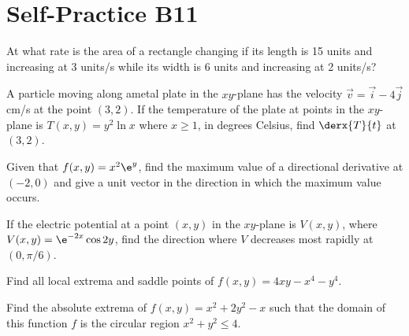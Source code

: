 \section{Self-Practice B11}

\begin{problem}
    At what rate is the area of a rectangle changing if its length is 15 units and increasing at 3 units/s while its width is 6 units and increasing at 2 units/s?
\end{problem}

\begin{problem}
    A particle moving along ametal plate in the $xy$-plane has the velocity $\vec v = \vec i - 4 \vec j$ cm/s at the point $(3, 2)$. If the temperature of the plate at points in the $xy$-plane is $T(x, y) = y^2 \ln x$ where $x \geq 1$, in degrees Celsius, find $\derx{T}{t}$ at $(3, 2)$.
\end{problem}

\begin{problem}
    Given that $f(x, y) = x^2 \e^y$, find the maximum value of a directional derivative at $(-2, 0)$ and give a unit vector in the direction in which the maximum value occurs.
\end{problem}

\begin{problem}
    If the electric potential at a point $(x, y)$ in the $xy$-plane is $V(x, y)$, where $V(x, y) = \e^{-2x} \cos 2y$, find the direction where $V$ decreases most rapidly at $(0, \pi/6)$.
\end{problem}

\begin{problem}
    Find all local extrema and saddle points of $f(x, y) = 4xy - x^4 - y^4$.
\end{problem}

\begin{problem}
    Find the absolute extrema of $f(x, y) = x^2 + 2y^2 - x$ such that the domain of this function $f$ is the circular region $x^2 + y^2 \leq 4$.
\end{problem}

